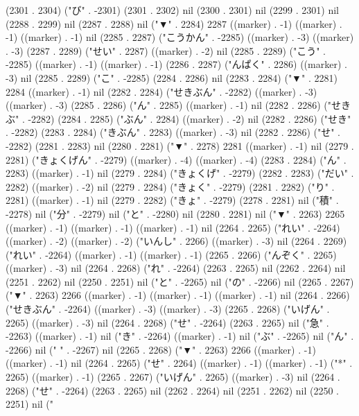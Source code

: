 (2301 . 2304) ("び" . -2301) (2301 . 2302) nil (2300 . 2301) nil (2299 . 2301) nil (2288 . 2299) nil (2287 . 2288) nil ("▼" . 2284) 2287 ((marker) . -1) ((marker) . -1) ((marker) . -1) nil (2285 . 2287) ("こうかん" . -2285) ((marker) . -3) ((marker) . -3) (2287 . 2289) ("せい" . 2287) ((marker) . -2) nil (2285 . 2289) ("こう" . -2285) ((marker) . -1) ((marker) . -1) (2286 . 2287) ("んぱく" . 2286) ((marker) . -3) nil (2285 . 2289) ("こ" . -2285) (2284 . 2286) nil (2283 . 2284) ("▼" . 2281) 2284 ((marker) . -1) nil (2282 . 2284) ("せきぶん" . -2282) ((marker) . -3) ((marker) . -3) (2285 . 2286) ("ん" . 2285) ((marker) . -1) nil (2282 . 2286) ("せきぶ" . -2282) (2284 . 2285) ("ぶん" . 2284) ((marker) . -2) nil (2282 . 2286) ("せき" . -2282) (2283 . 2284) ("きぶん" . 2283) ((marker) . -3) nil (2282 . 2286) ("せ" . -2282) (2281 . 2283) nil (2280 . 2281) ("▼" . 2278) 2281 ((marker) . -1) nil (2279 . 2281) ("きょくげん" . -2279) ((marker) . -4) ((marker) . -4) (2283 . 2284) ("ん" . 2283) ((marker) . -1) nil (2279 . 2284) ("きょくげ" . -2279) (2282 . 2283) ("だい" . 2282) ((marker) . -2) nil (2279 . 2284) ("きょく" . -2279) (2281 . 2282) ("り" . 2281) ((marker) . -1) nil (2279 . 2282) ("きょ" . -2279) (2278 . 2281) nil ("積" . -2278) nil ("分" . -2279) nil ("と" . -2280) nil (2280 . 2281) nil ("▼" . 2263) 2265 ((marker) . -1) ((marker) . -1) ((marker) . -1) nil (2264 . 2265) ("れい" . -2264) ((marker) . -2) ((marker) . -2) ("いんし" . 2266) ((marker) . -3) nil (2264 . 2269) ("れい" . -2264) ((marker) . -1) ((marker) . -1) (2265 . 2266) ("んぞく" . 2265) ((marker) . -3) nil (2264 . 2268) ("れ" . -2264) (2263 . 2265) nil (2262 . 2264) nil (2251 . 2262) nil (2250 . 2251) nil ("と" . -2265) nil ("の" . -2266) nil (2265 . 2267) ("▼" . 2263) 2266 ((marker) . -1) ((marker) . -1) ((marker) . -1) nil (2264 . 2266) ("せきぶん" . -2264) ((marker) . -3) ((marker) . -3) (2265 . 2268) ("いげん" . 2265) ((marker) . -3) nil (2264 . 2268) ("せ" . -2264) (2263 . 2265) nil ("急" . -2263) ((marker) . -1) nil ("き" . -2264) ((marker) . -1) nil ("ぶ" . -2265) nil ("ん" . -2266) nil (" " . -2267) nil (2265 . 2268) ("▼" . 2263) 2266 ((marker) . -1) ((marker) . -1) nil (2264 . 2265) ("せ" . 2264) ((marker) . -1) ((marker) . -1) ("*" . 2265) ((marker) . -1) (2265 . 2267) ("いげん" . 2265) ((marker) . -3) nil (2264 . 2268) ("せ" . -2264) (2263 . 2265) nil (2262 . 2264) nil (2251 . 2262) nil (2250 . 2251) nil ("
